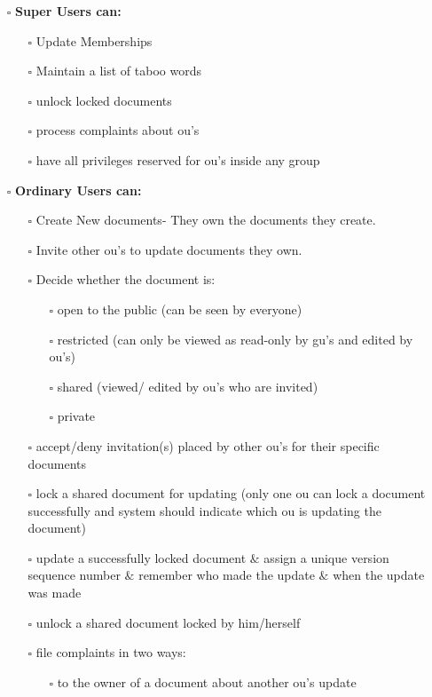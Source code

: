 \documentclass{article}
\begin{document}
	\begin{itemize}
		\item [$\square$] \textbf{Super Users can:}
		\begin{itemize}
			\item [$\square$] Update Memberships
			\item [$\square$] Maintain a list of taboo words
			\item [$\square$] unlock locked documents
			\item [$\square$] process complaints about ou's
			\item [$\square$] have all privileges reserved for ou's inside any group
		\end{itemize}
		\item [$\square$] \textbf{Ordinary Users can:}
		\begin{itemize}
			\item [$\square$] Create New documents- They own the documents they create.
			\item [$\square$] Invite other ou's to update documents they own.
			\item [$\square$] Decide whether the document is:
			\begin{itemize}
				\item [$\square$] open to the public (can be seen by everyone)
				\item [$\square$] restricted (can only be viewed as read-only by gu's and edited by ou's)
				\item [$\square$] shared (viewed/ edited by ou's who are invited)
				\item [$\square$] private
			\end{itemize}
			\item [$\square$] accept/deny invitation(s) placed by other ou's for their specific documents
			\item [$\square$] lock a shared document for updating (only one ou can lock a document successfully and system should indicate which ou is updating the document)
			\item [$\square$] update a successfully locked document $\&$ assign a unique version sequence number $\&$ remember who made the update $\&$ when the update was made
			\item [$\square$] unlock a shared document locked by him/herself
			\item [$\square$] file complaints in two ways:
			\begin{enumerate}
				\item [$\square$] to the owner of a document about another ou's update

\end{enumerate}
\end{itemize}
\end{itemize}
\end{document}
